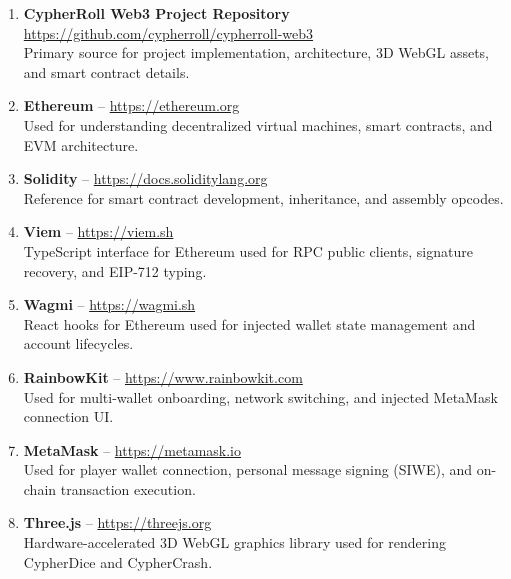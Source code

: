 \vspace{1.0cm}
\par
\label{chap:reference}
\vspace{0.3cm}

\begin{enumerate}[leftmargin=1.8em,itemsep=0.8em]
    \item \textbf{CypherRoll Web3 Project Repository} \\
    \url{https://github.com/cypherroll/cypherroll-web3} \\
    Primary source for project implementation, architecture, 3D WebGL assets, and smart contract details.

    \item \textbf{Ethereum} -- \url{https://ethereum.org} \\
    Used for understanding decentralized virtual machines, smart contracts, and EVM architecture.

    \item \textbf{Solidity} -- \url{https://docs.soliditylang.org} \\
    Reference for smart contract development, inheritance, and assembly opcodes.

    \item \textbf{Viem} -- \url{https://viem.sh} \\
    TypeScript interface for Ethereum used for RPC public clients, signature recovery, and EIP-712 typing.

    \item \textbf{Wagmi} -- \url{https://wagmi.sh} \\
    React hooks for Ethereum used for injected wallet state management and account lifecycles.

    \item \textbf{RainbowKit} -- \url{https://www.rainbowkit.com} \\
    Used for multi-wallet onboarding, network switching, and injected MetaMask connection UI.

    \item \textbf{MetaMask} -- \url{https://metamask.io} \\
    Used for player wallet connection, personal message signing (SIWE), and on-chain transaction execution.

    \item \textbf{Three.js} -- \url{https://threejs.org} \\
    Hardware-accelerated 3D WebGL graphics library used for rendering CypherDice and CypherCrash.


\end{enumerate}
